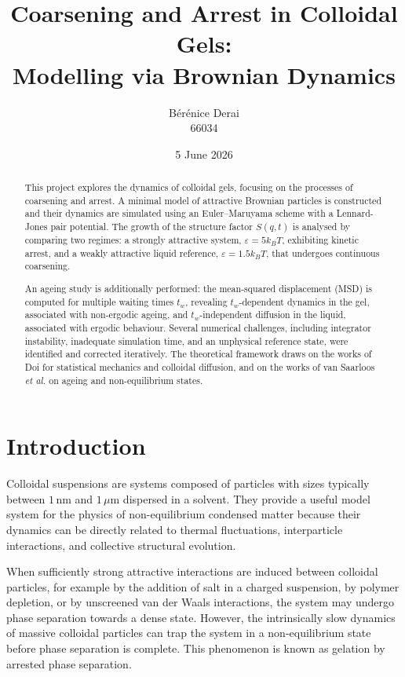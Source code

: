 \documentclass[11pt,a4paper]{article}
\title{\textbf{Coarsening and Arrest in Colloidal Gels:}\\
Modelling via Brownian Dynamics}
\author{Bérénice Derai \\ 66034}
\date{5 June 2026}
\begin{document}
\maketitle

\begin{abstract}
This project explores the dynamics of colloidal gels, focusing on the processes of coarsening and arrest. A minimal model of attractive Brownian particles is constructed and their dynamics are simulated using an Euler--Maruyama scheme with a Lennard-Jones pair potential. The growth of the structure factor $S(q,t)$ is analysed by comparing two regimes: a strongly attractive system, $\varepsilon = 5 k_B T$, exhibiting kinetic arrest, and a weakly attractive liquid reference, $\varepsilon = 1.5 k_B T$, that undergoes continuous coarsening.

An ageing study is additionally performed: the mean-squared displacement (MSD) is computed for multiple waiting times $t_w$, revealing $t_w$-dependent dynamics in the gel, associated with non-ergodic ageing, and $t_w$-independent diffusion in the liquid, associated with ergodic behaviour. Several numerical challenges, including integrator instability, inadequate simulation time, and an unphysical reference state, were identified and corrected iteratively. The theoretical framework draws on the works of Doi for statistical mechanics and colloidal diffusion, and on the works of van Saarloos \textit{et al.} on ageing and non-equilibrium states.
\end{abstract}

\tableofcontents
\newpage

\section{Introduction}

Colloidal suspensions are systems composed of particles with sizes typically between $1\,\mathrm{nm}$ and $1\,\mu\mathrm{m}$ dispersed in a solvent. They provide a useful model system for the physics of non-equilibrium condensed matter because their dynamics can be directly related to thermal fluctuations, interparticle interactions, and collective structural evolution.

When sufficiently strong attractive interactions are induced between colloidal particles, for example by the addition of salt in a charged suspension, by polymer depletion, or by unscreened van der Waals interactions, the system may undergo phase separation towards a dense state. However, the intrinsically slow dynamics of massive colloidal particles can trap the system in a non-equilibrium state before phase separation is complete. This phenomenon is known as gelation by arrested phase separation.
\end{document}
